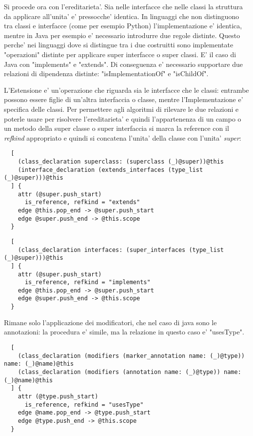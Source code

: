Si procede ora con l'ereditarieta'.
Sia nelle interfacce che nelle classi la struttura da applicare all'unita' e' pressocche' identica. In linguaggi che non distinguono tra classi e interfacce (come per esempio Python) l'implementazione e' identica, mentre in Java per esempio e' necessario introdurre due regole distinte. Questo perche' nei linguaggi dove si distingue tra i due costruitti sono implementate "operazioni" distinte per applicare super interfacce o super classi. E' il caso di Java con "implements" e "extends". Di conseguenza e' necessario supportare due relazioni di dipendenza distinte: "isImplementationOf" e "isChildOf".

L'Estensione e' un'operazione che riguarda sia le interfacce che le classi: entrambe possono essere figlie di un'altra interfaccia o classe, mentre l'Implementazione e' specifica delle classi.
Per permettere agli algoritmi di rilevare le due relazioni e poterle usare per risolvere l'ereditarieta' e quindi l'appartenenza di un campo o un metodo della super classe o super interfaccia si marca la reference con il \emph{refkind} appropriato e quindi si concatena l'unita' della classe con l'unita' \emph{super}:

\begin{lstlisting}
  [
    (class_declaration superclass: (superclass (_)@super))@this
    (interface_declaration (extends_interfaces (type_list (_)@super)))@this
  ] {
    attr (@super.push_start)
      is_reference, refkind = "extends"
    edge @this.pop_end -> @super.push_start
    edge @super.push_end -> @this.scope
  }
\end{lstlisting}

\begin{lstlisting}
  [
    (class_declaration interfaces: (super_interfaces (type_list (_)@super)))@this
  ] {
    attr (@super.push_start)
      is_reference, refkind = "implements"
    edge @this.pop_end -> @super.push_start
    edge @super.push_end -> @this.scope
  }
\end{lstlisting}

Rimane solo l'applicazione dei modificatori, che nel caso di java sono le annotazioni: la procedura e' simile, ma la relazione in questo caso e' "usesType".

\begin{lstlisting}
  [
    (class_declaration (modifiers (marker_annotation name: (_)@type)) name: (_)@name)@this
    (class_declaration (modifiers (annotation name: (_)@type)) name: (_)@name)@this
  ] {
    attr (@type.push_start)
      is_reference, refkind = "usesType"
    edge @name.pop_end -> @type.push_start
    edge @type.push_end -> @this.scope
  }
\end{lstlisting}

